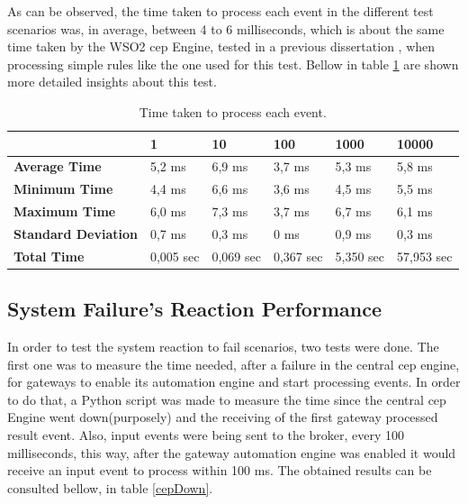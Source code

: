 As can be observed, the time taken to process each event in the different test scenarios was, in average, between 4 to 6 milliseconds, which is about the same time taken by the WSO2 \ac{cep} Engine, tested in a previous dissertation \cite{helder}, when processing simple rules like the one used for this test. Bellow in table \ref{table:event} are shown more detailed insights about this test.

\begin{table}[H]
	\begin{tabular}{l|l|l|l|l|l|}
		\cline{2-6}
		& \textbf{1} & \textbf{10} & \textbf{100} & \textbf{1000} & \textbf{10000} \\ \hline
		\multicolumn{1}{|l|}{\textbf{Average Time}}       & 5,2 ms     & 6,9 ms      & 3,7 ms       & 5,3 ms        & 5,8 ms         \\ \hline
		\multicolumn{1}{|l|}{\textbf{Minimum Time}}       & 4,4 ms     & 6,6 ms      & 3,6 ms       & 4,5 ms        & 5,5 ms         \\ \hline
		\multicolumn{1}{|l|}{\textbf{Maximum Time}}       & 6,0 ms     & 7,3 ms      & 3,7 ms       & 6,7 ms        & 6,1 ms         \\ \hline
		\multicolumn{1}{|l|}{\textbf{Standard Deviation}} & 0,7 ms     & 0,3 ms      & 0 ms         & 0,9 ms        & 0,3 ms         \\ \hline
		\multicolumn{1}{|l|}{\textbf{Total Time}}         & 0,005 sec  & 0,069 sec   & 0,367 sec    & 5,350 sec     & 57,953 sec     \\ \hline
	\end{tabular}
	\centering
\caption{Time taken to process each event.}
\label{table:event}
\end{table}

\subsection{System Failure's Reaction Performance}
\label{results:fail}

In order to test the system reaction to fail scenarios, two tests were done. The first one was to measure the time needed, after a failure in the central \ac{cep} engine, for gateways to enable its automation engine and start processing events. In order to do that, a Python script was made to measure the time since the central \ac{cep} Engine went down(purposely) and the receiving of the first gateway processed result event. Also, input events were being sent to the broker, every 100 milliseconds, this way, after the gateway automation engine was enabled it would receive an input event to process within 100 ms. The obtained results can be consulted bellow, in table \ref{cepDown}.


